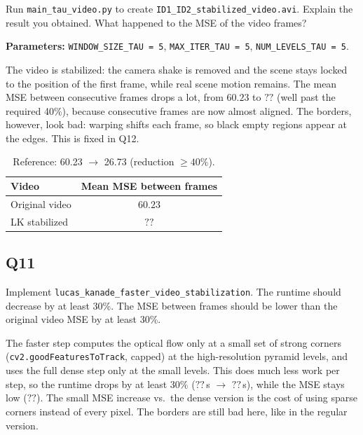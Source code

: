 \documentclass[11pt]{article}
\begin{document}
Run \texttt{main\_tau\_video.py} to create \texttt{ID1\_ID2\_stabilized\_video.avi}. Explain the result you obtained. What happened to the MSE of the video frames?

\medskip
\noindent\textbf{Parameters:} \texttt{WINDOW\_SIZE\_TAU = 5},
\texttt{MAX\_ITER\_TAU = 5}, \texttt{NUM\_LEVELS\_TAU = 5}.

\medskip
\noindent
The video is stabilized: the camera shake is removed and the scene stays locked to the
position of the first frame, while real scene motion remains. The mean MSE between
consecutive frames drops a lot, from $60.23$ to $??$ (well past the required 40\%),
because consecutive frames are now almost aligned. The borders, however, look bad:
warping shifts each frame, so black empty regions appear at the edges. This is fixed in
Q12.

\begin{table}[H]
    \centering
    \begin{tabular}{lc}
        \hline
        \textbf{Video}                        & \textbf{Mean MSE between frames} \\
        \hline
        Original video                        & $60.23$ \\
        LK stabilized                         & $??$ \\
        \hline
    \end{tabular}
    \caption{Reference: 60.23 $\to$ 26.73 (reduction $\geq 40\%$).}
\end{table}


\subsection*{Q11}

Implement \texttt{lucas\_kanade\_faster\_video\_stabilization}. The runtime should decrease by at least 30\%. The MSE between frames should be lower than the original video MSE by at least 30\%.

\medskip
\noindent
The faster step computes the optical flow only at a small set of strong corners
(\texttt{cv2.goodFeaturesToTrack}, capped) at the high-resolution pyramid levels, and
uses the full dense step only at the small levels. This does much less work per step,
so the runtime drops by at least 30\% ($??$\,s $\to$ $??$\,s), while the MSE stays low
($??$). The small MSE increase vs.\ the dense version is the cost of using sparse
corners instead of every pixel. The borders are still bad here, like in the regular
version.
\end{document}

